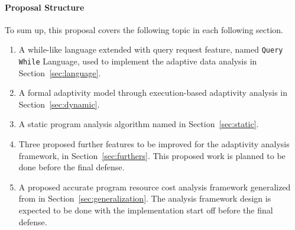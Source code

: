 \paragraph*{Proposal Structure}
To sum up, this proposal covers the following topic in each following section.
\begin{enumerate}
\item A while-like language extended with query request feature, named {\tt Query While} Language, 
used to implement 
the adaptive data analysis in Section~\ref{sec:language}.
\item A formal adaptivity model through execution-based adaptivity analysis in Section~\ref{sec:dynamic}.
\item A static program analysis algorithm named {\THESYSTEM} in Section~\ref{sec:static}.
\item Three proposed further features to be improved for the adaptivity analysis framework,
in Section~\ref{sec:furthers}.
 This proposed work is planned to be done before the final defense.
\item A proposed accurate program resource cost analysis framework generalized from {\THESYSTEM} in Section~\ref{sec:generalization}. 
The analysis framework design is expected to be done with the implementation start off before the final defense.
\end{enumerate}
